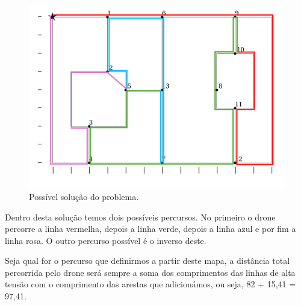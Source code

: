\documentclass{article}
\begin{document}
\begin{figure}[H]
    \centering
    \includegraphics[width=0.8\linewidth]{fig5.png}
    \caption{Possível solução do problema.}
    \label{solucao}
\end{figure}

Dentro desta solução temos dois possíveis percursos. No primeiro o drone percorre a linha vermelha, depois a linha verde, depois a linha azul e por fim a linha rosa. O outro percurso possível é o inverso deste.

Seja qual for o percurso que definirmos a partir deste mapa, a distância total percorrida pelo drone será sempre a soma dos comprimentos das linhas de alta tensão com o comprimento das arestas que adicionámos, ou seja, 82 + 15,41 = 97,41.
\end{document}
